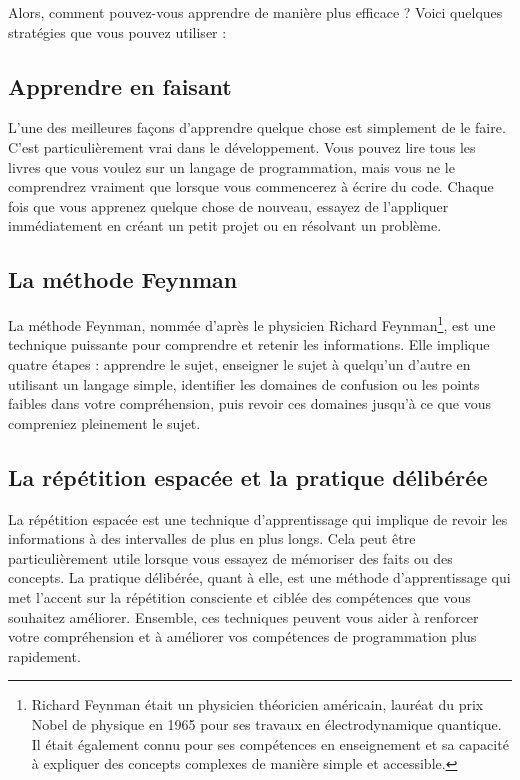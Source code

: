 Alors, comment pouvez-vous apprendre de manière plus efficace ? Voici quelques stratégies que vous pouvez utiliser :

\subsection{Apprendre en faisant}

L'une des meilleures façons d'apprendre quelque chose est simplement de le faire. C'est particulièrement vrai dans le développement. Vous pouvez lire tous les livres que vous voulez sur un langage de programmation, mais vous ne le comprendrez vraiment que lorsque vous commencerez à écrire du code. Chaque fois que vous apprenez quelque chose de nouveau, essayez de l'appliquer immédiatement en créant un petit projet ou en résolvant un problème.

\subsection{La méthode Feynman}

La méthode Feynman, nommée d'après le physicien Richard Feynman\footnote{Richard Feynman était un physicien théoricien américain, lauréat du prix Nobel de physique en 1965 pour ses travaux en électrodynamique quantique. Il était également connu pour ses compétences en enseignement et sa capacité à expliquer des concepts complexes de manière simple et accessible.}, est une technique puissante pour comprendre et retenir les informations. Elle implique quatre étapes : apprendre le sujet, enseigner le sujet à quelqu'un d'autre en utilisant un langage simple, identifier les domaines de confusion ou les points faibles dans votre compréhension, puis revoir ces domaines jusqu'à ce que vous compreniez pleinement le sujet.

\subsection{La répétition espacée et la pratique délibérée}

La répétition espacée est une technique d'apprentissage qui implique de revoir les informations à des intervalles de plus en plus longs. Cela peut être particulièrement utile lorsque vous essayez de mémoriser des faits ou des concepts. La pratique délibérée, quant à elle, est une méthode d'apprentissage qui met l'accent sur la répétition consciente et ciblée des compétences que vous souhaitez améliorer. Ensemble, ces techniques peuvent vous aider à renforcer votre compréhension et à améliorer vos compétences de programmation plus rapidement.

